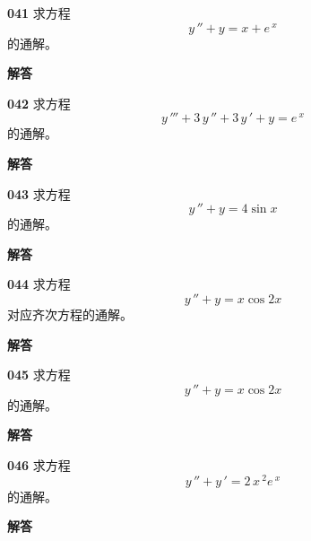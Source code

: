 \documentclass[a4paper,10pt]{article} %
\begin{document}
\textheight


\par\noindent \textbf{041} \quad 求方程
$$y\,''+y=x+e\,^x$$
的通解。
\par\noindent \textbf{ 解答}





\textheight


\par\noindent \textbf{042} \quad 求方程
$$y\,'''+3\,y\,''+3\,y\,'+y=e\,^x$$
的通解。
\par\noindent \textbf{ 解答}





\textheight


\par\noindent \textbf{043} \quad 求方程
$$y\,''+y=4\sin x$$
的通解。
\par\noindent \textbf{ 解答}





\textheight


\par\noindent \textbf{044} \quad 求方程
$$y\,''+y=x\cos 2x$$
对应齐次方程的通解。
\par\noindent \textbf{ 解答}





\textheight


\par\noindent \textbf{045} \quad 求方程
$$y\,''+y=x\cos 2x$$
的通解。
\par\noindent \textbf{ 解答}





\textheight


\par\noindent \textbf{046} \quad 求方程
$$y\,''+y\,'=2\,x\,^2 e\,^x$$
的通解。
\par\noindent \textbf{ 解答}
\end{document}
